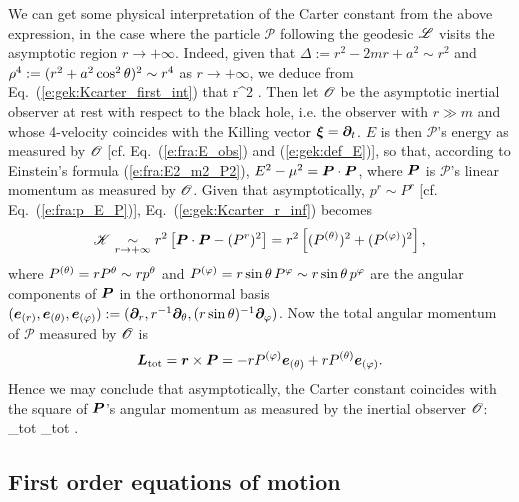 We can get some physical interpretation of the Carter constant from the above
expression, in the case where the particle $\mathscr{P}$ following the
geodesic $\mathscr{L}$ visits the asymptotic region $r\to+\infty$. Indeed, given
that $\Delta := r^2 - 2m r + a^2 \sim r^2$  and $\rho^4 := (r^2 + a^2\cos^2\theta)^2 \sim r^4$
as $r\to+\infty$, we deduce from Eq.~(\ref{e:gek:Kcarter_first_int})
that
\be \label{e:gek:Kcarter_r_inf}
      r^2 \left[ E^2 - \mu^2 - (p^r)^2 \right] .
\ee
Then let $\mathscr{O}$ be the asymptotic inertial observer at rest with respect to the
black hole, i.e. the observer with $r\gg m$ and whose 4-velocity
coincides with the Killing vector
$\bm{\xi} = \bm{\partial}_t$. $E$ is then $\mathscr{P}$'s energy as measured by $\mathscr{O}$
[cf. Eq.~(\ref{e:fra:E_obs}) and (\ref{e:gek:def_E})], so that, according to
Einstein's formula (\ref{e:fra:E2_m2_P2}), $E^2 - \mu^2 = \bm{P}\cdot\bm{P}$, where
$\bm{P}$ is $\mathscr{P}$'s linear momentum as measured by $\mathscr{O}$. Given
that asymptotically, $p^r\sim P^r$ [cf. Eq.~(\ref{e:fra:p_E_P})],
Eq.~(\ref{e:gek:Kcarter_r_inf}) becomes
\[
    \mathscr{K} \underset{r\to + \infty}{\sim} r^2 \left[ \bm{P}\cdot\bm{P} - (P^r)^2 \right]
    = r^2 \left[ (P^{(\theta)})^2 + (P^{(\varphi)})^2 \right],
\]
where $P^{(\theta)} = r P^\theta \sim r p^\theta$ and $P^{(\varphi)} = r\sin\theta\, P^\varphi \sim r\sin\theta\, p^\varphi$
are the angular components of $\bm{P}$ in the
orthonormal basis $(\bm{e}_{(r)}, \bm{e}_{(\theta)}, \bm{e}_{(\varphi)}) := (\bm{\partial}_r, r^{-1} \bm{\partial}_\theta,
(r\sin\theta)^{-1}\bm{\partial}_\varphi)$.
Now the total angular momentum of $\mathscr{P}$ measured by $\mathscr{O}$ is
\[
    \bm{L}_{\rm tot} = \bm{r} \times \bm{P} = - r P^{(\varphi)} \bm{e}_{(\theta)}
        + r P^{(\theta)} \bm{e}_{(\varphi)} .
\]
Hence we may conclude that asymptotically, the Carter constant coincides with
the square of $\bm{P}$'s angular momentum as measured by the inertial observer $\mathscr{O}$:
\be \label{e:gek:Kcarter_asymptot}
      _{\rm tot} \cdot {}_{\rm tot} .
\ee

\subsection{First order equations of motion} \label{s:gek:first_order_system}

